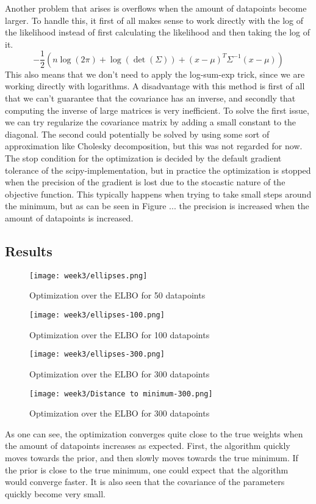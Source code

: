 Another problem that arises is overflows when the amount of datapoints become larger.
To handle this, it first of all makes sense to work directly with the log of the likelihood instead of first calculating the likelihood and then taking the log of it.
$$-\frac{1}{2}(n \log(2\pi) + \log(\det(\Sigma)) + (x-\mu)^T \Sigma^{-1}(x-\mu))$$ 
This also means that we don't need to apply the log-sum-exp trick, since we are working directly with logarithms.
A disadvantage with this method is first of all that we can't guarantee that the covariance has an inverse, and secondly that computing the inverse of large matrices is very inefficient.
To solve the first issue, we can try regularize the covariance matrix by adding a small constant to the diagonal.
The second could potentially be solved by using some sort of approximation like Cholesky decomposition, but this was not regarded for now.
The stop condition for the optimization is decided by the default gradient tolerance of the scipy-implementation, 
but in practice the optimization is stopped when the precision of the gradient is lost due to the stocastic nature of the objective function.
This typically happens when trying to take small steps around the minimum, but as can be seen in Figure ... the precision is increased when the amount of datapoints is increased.
\subsection{Results}
\begin{figure}[H]
  \centering
  \texttt{[image: week3/ellipses.png]}
  \caption{Optimization over the ELBO for 50 datapoints}
\end{figure}
\begin{figure}[H]
  \centering
  \texttt{[image: week3/ellipses-100.png]}
  \caption{Optimization over the ELBO for 100 datapoints}
\end{figure}
\begin{figure}[H]
  \centering
  \texttt{[image: week3/ellipses-300.png]}
  \caption{Optimization over the ELBO for 300 datapoints}
\end{figure}
\begin{figure}[H]
  \centering
  \texttt{[image: week3/Distance to minimum-300.png]}
  \caption{Optimization over the ELBO for 300 datapoints}
\end{figure}
As one can see, the optimization converges quite close to the true weights when the amount of datapoints increases as expected.
First, the algorithm quickly moves towards the prior, and then slowly moves towards the true minimum. 
If the prior is close to the true minimum, one could expect that the algorithm would converge faster.
It is also seen that the covariance of the parameters quickly become very small. 

